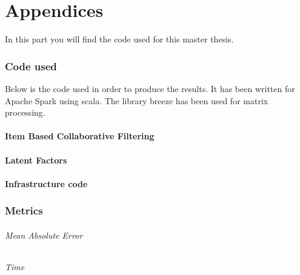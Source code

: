 \newpage
\appendix
\part{Appendices}
In this part you will find the code used for this master thesis.
\section{Code used}
Below is the code used in order to produce the results. It has been 
written for Apache Spark \cite{ApacheSpark:1} using scala. The library breeze has been used for matrix processing.
\subsection{Item Based Collaborative Filtering}

\subsection{Latent Factors}

\subsection{Infrastructure code}


\section{Metrics}
\paragraph{Mean Absolute Error}
\paragraph{Time}
\listoftables
\newpage
\listoffigures